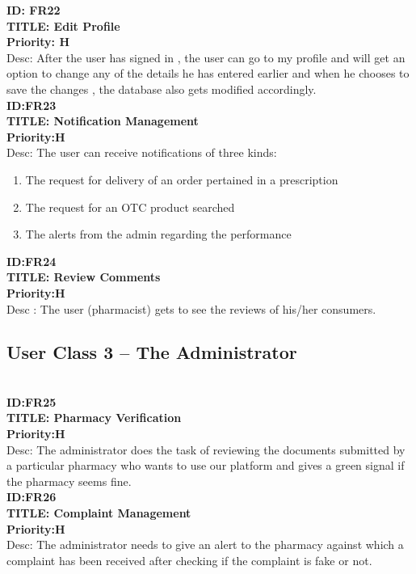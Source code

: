 \documentclass{scrreprt}
\begin{document}
\textbf{ID: FR22}  \\
\textbf{TITLE: Edit Profile}  \\
\textbf{Priority: H}  \\
Desc:  After the user has signed in , the user can go to my profile and will get an option to change any of the details he has entered earlier  and when he chooses to save the changes , the database also gets modified accordingly.  \\

\textbf{ID:FR23}  \\
\textbf{TITLE: Notification Management}  \\
\textbf{Priority:H}   \\
Desc: The user can receive notifications of three kinds:  
\begin{enumerate}
\item	The request for delivery of an order pertained in a prescription  
\item	The request for an OTC product searched   
\item	The alerts from the admin regarding the performance   
\end{enumerate}

\textbf{ID:FR24}  \\
\textbf{TITLE: Review Comments}   \\
\textbf{Priority:H}  \\
Desc : The user (pharmacist) gets to see the reviews of his/her consumers.  \\

\subsection{User Class 3 – The Administrator}  \\
\textbf{ID:FR25}   \\
\textbf{TITLE: Pharmacy Verification}  \\
\textbf{Priority:H}   \\
Desc: The administrator does the task of reviewing the documents submitted by a particular pharmacy who wants to use our platform and gives a green signal if the pharmacy seems fine.  \\

\textbf{ID:FR26}  \\
\textbf{TITLE: Complaint Management}  \\
\textbf{Priority:H}   \\
Desc: The administrator needs to give an alert to the pharmacy against which a complaint has been received after checking if the complaint is fake or not.  \\
\end{document}
